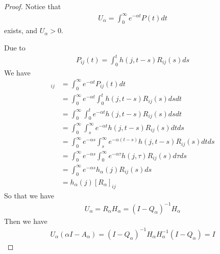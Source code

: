 \documentclass[runningheads]{llncs}
\begin{document}
    \subsection{}
    \begin{proof}
        Notice that 
        \begin{align}
            U_\alpha = \int_0^\infty e^{-\alpha t} P(t)dt
        \end{align} exists, and $U_\alpha > 0$.
        \par
        Due to
        \begin{align}
            P_{ij}(t) = \int_0^t h(j, t - s) R_{ij}(s)ds
        \end{align}
        We have
        \begin{align}
            [U_\alpha]_{ij} &= \int_0^\infty e^{-\alpha t} P_{ij}(t)dt \\
            &= \int_0^\infty e^{-\alpha t} \int_0^t h(j, t - s) R_{ij}(s)dsdt \\
            &= \int_0^\infty \int_0^t e^{-\alpha t} h(j, t - s) R_{ij}(s)dsdt \\
            &= \int_0^\infty \int_s^\infty e^{-\alpha t} h(j, t - s) R_{ij}(s)dtds \\
            &= \int_0^\infty e^{-\alpha s} \int_s^\infty e^{-\alpha (t - s)} h(j, t - s) R_{ij}(s)dtds \\
            &= \int_0^\infty e^{-\alpha s} \int_0^\infty e^{-\alpha \tau} h(j, \tau) R_{ij}(s)d\tau ds \\
            &= \int_0^\infty e^{-\alpha s} h_\alpha (j) R_{ij}(s) ds \\
            &= h_\alpha (j) [R_\alpha]_{ij} 
        \end{align}
        So that we have
        \begin{align}
            U_\alpha = R_\alpha H_\alpha = (I - Q_\alpha)^{-1} H_\alpha
        \end{align}
        Then we have
        \begin{align}
            U_\alpha (\alpha I - A_\alpha) = (I - Q_\alpha)^{-1} H_\alpha H_\alpha^{-1}(I - Q_\alpha) = I
        \end{align}
    \end{proof}
\end{document}
